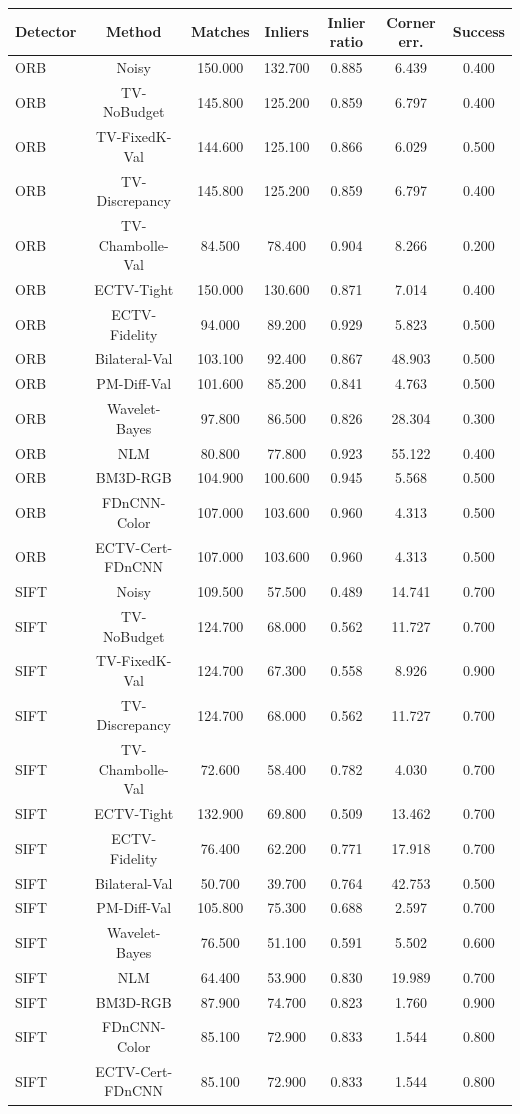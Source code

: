 \begin{tabular}{lcccccc}
\toprule
Detector & Method & Matches & Inliers & Inlier ratio & Corner err. & Success \\
\midrule
ORB & Noisy & 150.000 & 132.700 & 0.885 & 6.439 & 0.400 \\
ORB & TV-NoBudget & 145.800 & 125.200 & 0.859 & 6.797 & 0.400 \\
ORB & TV-FixedK-Val & 144.600 & 125.100 & 0.866 & 6.029 & 0.500 \\
ORB & TV-Discrepancy & 145.800 & 125.200 & 0.859 & 6.797 & 0.400 \\
ORB & TV-Chambolle-Val & 84.500 & 78.400 & 0.904 & 8.266 & 0.200 \\
ORB & ECTV-Tight & 150.000 & 130.600 & 0.871 & 7.014 & 0.400 \\
ORB & ECTV-Fidelity & 94.000 & 89.200 & 0.929 & 5.823 & 0.500 \\
ORB & Bilateral-Val & 103.100 & 92.400 & 0.867 & 48.903 & 0.500 \\
ORB & PM-Diff-Val & 101.600 & 85.200 & 0.841 & 4.763 & 0.500 \\
ORB & Wavelet-Bayes & 97.800 & 86.500 & 0.826 & 28.304 & 0.300 \\
ORB & NLM & 80.800 & 77.800 & 0.923 & 55.122 & 0.400 \\
ORB & BM3D-RGB & 104.900 & 100.600 & 0.945 & 5.568 & 0.500 \\
ORB & FDnCNN-Color & 107.000 & 103.600 & 0.960 & 4.313 & 0.500 \\
ORB & ECTV-Cert-FDnCNN & 107.000 & 103.600 & 0.960 & 4.313 & 0.500 \\
SIFT & Noisy & 109.500 & 57.500 & 0.489 & 14.741 & 0.700 \\
SIFT & TV-NoBudget & 124.700 & 68.000 & 0.562 & 11.727 & 0.700 \\
SIFT & TV-FixedK-Val & 124.700 & 67.300 & 0.558 & 8.926 & 0.900 \\
SIFT & TV-Discrepancy & 124.700 & 68.000 & 0.562 & 11.727 & 0.700 \\
SIFT & TV-Chambolle-Val & 72.600 & 58.400 & 0.782 & 4.030 & 0.700 \\
SIFT & ECTV-Tight & 132.900 & 69.800 & 0.509 & 13.462 & 0.700 \\
SIFT & ECTV-Fidelity & 76.400 & 62.200 & 0.771 & 17.918 & 0.700 \\
SIFT & Bilateral-Val & 50.700 & 39.700 & 0.764 & 42.753 & 0.500 \\
SIFT & PM-Diff-Val & 105.800 & 75.300 & 0.688 & 2.597 & 0.700 \\
SIFT & Wavelet-Bayes & 76.500 & 51.100 & 0.591 & 5.502 & 0.600 \\
SIFT & NLM & 64.400 & 53.900 & 0.830 & 19.989 & 0.700 \\
SIFT & BM3D-RGB & 87.900 & 74.700 & 0.823 & 1.760 & 0.900 \\
SIFT & FDnCNN-Color & 85.100 & 72.900 & 0.833 & 1.544 & 0.800 \\
SIFT & ECTV-Cert-FDnCNN & 85.100 & 72.900 & 0.833 & 1.544 & 0.800 \\
\bottomrule
\end{tabular}
